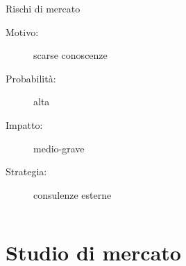 \documentclass[compress,9pt]{beamer}
\begin{document}
\begin{frame}
\begin{columns}
{{\begin{minipage}[b]{\textwidth}
\begin{block}{Rischi di mercato}
\begin{description}
  \item[Motivo:] scarse conoscenze
  \item[Probabilità:] alta
  \item[Impatto:] medio-grave
  \item[Strategia:] consulenze esterne
\end{description}
\end{block}
\end{minipage}
}
}
\end{columns}
\end{frame}

\section{Studio di mercato}
\end{document}
